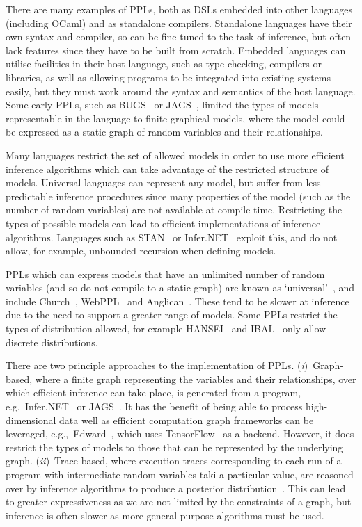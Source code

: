 \documentclass[sigconf]{acmart}
\newcommand{\one}{({\em i})\/}
\newcommand{\two}{({\em ii})\/}
\begin{document}
There are many examples of PPLs, both as DSLs embedded into other languages (including OCaml) and as standalone compilers. Standalone languages have their own syntax and compiler, so can be fine tuned to the task of inference, but often lack features since they have to be built from scratch. Embedded languages can utilise facilities in their host language, such as type checking, compilers or libraries, as well as allowing programs to be integrated into existing systems easily, but they must work around the syntax and semantics of the host language. Some early PPLs, such as BUGS~\cite{gilks1994bugs} or JAGS~\cite{plummer2004jags}, limited the types of models representable in the language to finite graphical models, where the model could be expressed as a static graph of random variables and their relationships.

Many languages restrict the set of allowed models in order to use more efficient inference algorithms which can take advantage of the restricted structure of models. Universal languages can represent any model, but suffer from less predictable inference procedures since many properties of the model (such as the number of random variables) are not available at compile-time. Restricting the types of possible models can lead to efficient implementations of inference algorithms. Languages such as STAN~\cite{carpenter2017stan} or Infer.NET~\cite{wang2011using} exploit this, and do not allow, for example, unbounded recursion when defining models.

PPLs which can express models that have an unlimited number of random variables (and so do not compile to a static graph) are known as `universal'~\cite{borgstrom2016lambda}, and include Church~\cite{goodman2012church}, WebPPL~\cite{mobus2018structure} and Anglican~\cite{anglican-smc}. These tend to be slower at inference due to the need to support a greater range of models. Some PPLs restrict the types of distribution allowed, for example HANSEI~\cite{kiselyov2009embedded} and IBAL~\cite{ibal} only allow discrete distributions.

There are two principle approaches to the implementation of PPLs. \one~Graph-based, where a finite graph representing the variables and their relationships, over which efficient inference can take place, is generated from a program, e.g,~Infer.NET~\cite{wang2011using} or JAGS~\cite{plummer2004jags}. It has the benefit of being able to process high-dimensional data well as efficient computation graph frameworks can be leveraged, e.g.,~Edward~\cite{edward}, which uses TensorFlow~\cite{tensorflow} as a backend. However, it does restrict the types of models to those that can be represented by the underlying graph. \two~Trace-based, where execution traces corresponding to each run of a program with intermediate random variables taki a particular value, are reasoned over by inference algorithms to produce a posterior distribution~\cite{anglican-smc,mobus2018structure}. This can lead to greater expressiveness as we are not limited by the constraints of a graph, but inference is often slower as more general purpose algorithms must be used.
\end{document}
